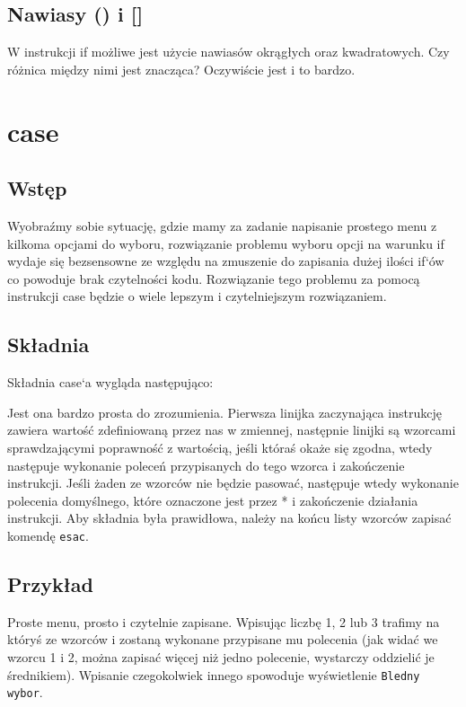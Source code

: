 \documentclass[10 pt, a4paper]{article}
\begin{document}
\subsection{Nawiasy () i []}
W instrukcji if możliwe jest użycie nawiasów okrągłych oraz kwadratowych. Czy różnica między nimi jest znacząca? Oczywiście jest i to bardzo.
\section{case}
\subsection{Wstęp}
Wyobraźmy sobie sytuację, gdzie mamy za zadanie napisanie prostego menu z kilkoma
opcjami do wyboru, rozwiązanie problemu wyboru opcji na warunku if wydaje się
bezsensowne ze względu na zmuszenie do zapisania dużej ilości if`ów co powoduje brak
czytelności kodu. Rozwiązanie tego problemu za pomocą instrukcji case będzie o wiele
lepszym i czytelniejszym rozwiązaniem.

\subsection{Składnia}
Składnia case`a wygląda następująco:



Jest ona bardzo prosta do zrozumienia. Pierwsza linijka zaczynająca instrukcję zawiera
wartość zdefiniowaną przez nas w zmiennej, następnie linijki są wzorcami sprawdzającymi
poprawność z wartością, jeśli któraś okaże się zgodna, wtedy następuje wykonanie poleceń
przypisanych do tego wzorca i zakończenie instrukcji. Jeśli żaden ze wzorców nie będzie
pasować, następuje wtedy wykonanie polecenia domyślnego, które oznaczone jest przez * i
zakończenie działania instrukcji. Aby składnia była prawidłowa, należy na końcu listy
wzorców zapisać komendę \texttt{esac}.

\subsection{Przykład} 



Proste menu, prosto i czytelnie zapisane. Wpisując liczbę 1, 2 lub 3 trafimy na któryś ze
wzorców i zostaną wykonane przypisane mu polecenia (jak widać we wzorcu 1 i 2, można
zapisać więcej niż jedno polecenie, wystarczy oddzielić je średnikiem). Wpisanie
czegokolwiek innego spowoduje wyświetlenie \texttt{Bledny wybor}.
\newline
\end{document}
